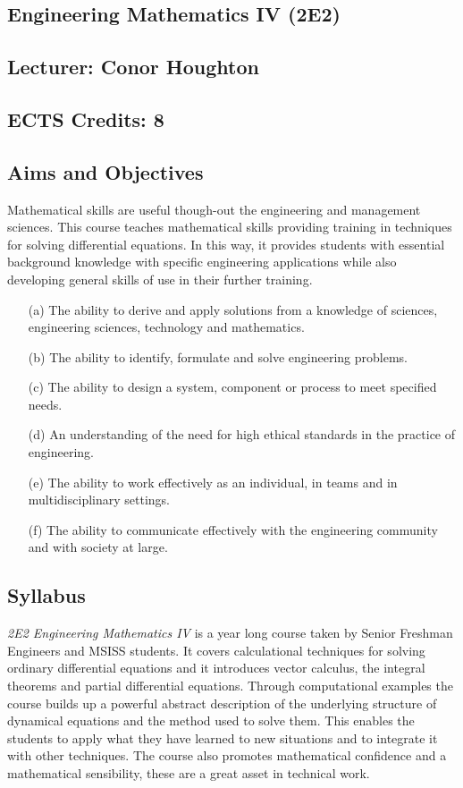 \documentclass[12pt,a4wide]{article}
\begin{document}
\subsection*{Engineering Mathematics IV (2E2)}
\subsection*{Lecturer: Conor Houghton}
\subsection*{ECTS Credits: 8}

\subsection*{Aims and Objectives}

Mathematical skills are useful though-out the engineering and
management sciences. This course teaches mathematical skills providing
training in techniques for solving differential equations. In this
way, it provides students with essential background knowledge with
specific engineering applications while also developing general skills
of use in their further training.

\begin{itemize}
\item[(a)] The ability to derive and apply solutions from a knowledge of sciences, engineering sciences, technology and mathematics.
\item[(b)] The ability to identify, formulate and solve engineering problems. 
\item[(c)] The ability to design a system, component or process to meet specified needs.
\item[(d)] An understanding of the need for high ethical standards in the practice of engineering.
\item[(e)] The ability to work effectively as an individual, in teams and in multidisciplinary settings.
\item[(f)] The ability to communicate effectively with the engineering community and with society at large.
\end{itemize}

\subsection*{Syllabus}

{\sl 2E2 Engineering Mathematics IV} is a year long course taken by
Senior Freshman Engineers and MSISS students. It covers calculational
techniques for solving ordinary differential equations and it
introduces vector calculus, the integral theorems and partial
differential equations. Through computational examples the course
builds up a powerful abstract description of the underlying structure
of dynamical equations and the method used to solve them. This enables
the students to apply what they have learned to new situations and to
integrate it with other techniques. The course also promotes
mathematical confidence and a mathematical sensibility, these are a
great asset in technical work.
\end{document}

